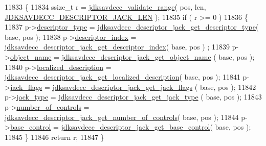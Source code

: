 \begin{DoxyCode}
11833 \{
11834     ssize\_t r = \hyperlink{group__util_ga9c02bdfe76c69163647c3196db7a73a1}{jdksavdecc\_validate\_range}( pos, len, 
      \hyperlink{group__descriptor__jack_ga3078d0ebe3d0d3bb58c01b9b0e984d23}{JDKSAVDECC\_DESCRIPTOR\_JACK\_LEN} );
11835     \textcolor{keywordflow}{if} ( r >= 0 )
11836     \{
11837         p->\hyperlink{structjdksavdecc__descriptor__jack_ab7c32b6c7131c13d4ea3b7ee2f09b78d}{descriptor\_type} = 
      \hyperlink{group__descriptor__jack_ga651daa6c8ccf52cdd55b6fc68122b4c4}{jdksavdecc\_descriptor\_jack\_get\_descriptor\_type}( base, pos );
11838         p->\hyperlink{structjdksavdecc__descriptor__jack_a042bbc76d835b82d27c1932431ee38d4}{descriptor\_index} = 
      \hyperlink{group__descriptor__jack_ga87120a7dafd647c7aa3f0903b8cf183a}{jdksavdecc\_descriptor\_jack\_get\_descriptor\_index}( base, pos )
      ;
11839         p->\hyperlink{structjdksavdecc__descriptor__jack_a7d1f5945a13863b1762fc6db74fa8f80}{object\_name} = \hyperlink{group__descriptor__jack_ga414ebcccf6aab5daf1262d2375060509}{jdksavdecc\_descriptor\_jack\_get\_object\_name}
      ( base, pos );
11840         p->\hyperlink{structjdksavdecc__descriptor__jack_a0926f846ca65a83ad5bb06b4aff8f408}{localized\_description} = 
      \hyperlink{group__descriptor__jack_gafe5ad1e08d6c98dec21c1a489fea3342}{jdksavdecc\_descriptor\_jack\_get\_localized\_description}( 
      base, pos );
11841         p->\hyperlink{structjdksavdecc__descriptor__jack_a000aef56fd1952d63d00e36f44c49d56}{jack\_flags} = \hyperlink{group__descriptor__jack_gad47529461dd0b81cd2d7273c8cc2c024}{jdksavdecc\_descriptor\_jack\_get\_jack\_flags}
      ( base, pos );
11842         p->\hyperlink{structjdksavdecc__descriptor__jack_afa0cc3c6946fb59ecf753ab5d0c04a7b}{jack\_type} = \hyperlink{group__descriptor__jack_ga1a9ce117eb7e8e95686e4101c253be0b}{jdksavdecc\_descriptor\_jack\_get\_jack\_type}
      ( base, pos );
11843         p->\hyperlink{structjdksavdecc__descriptor__jack_a0104bea638bdadf1a547c2b93813e22f}{number\_of\_controls} = 
      \hyperlink{group__descriptor__jack_ga519ff673725c6cc9157798a24bf1876d}{jdksavdecc\_descriptor\_jack\_get\_number\_of\_controls}( base, 
      pos );
11844         p->\hyperlink{structjdksavdecc__descriptor__jack_af06eac7dd98377a85258308e8a25e7f2}{base\_control} = 
      \hyperlink{group__descriptor__jack_ga66e6cd48fd68493c3b3ac954c69dfec4}{jdksavdecc\_descriptor\_jack\_get\_base\_control}( base, pos );
11845     \}
11846     \textcolor{keywordflow}{return} r;
11847 \}
\end{DoxyCode}


